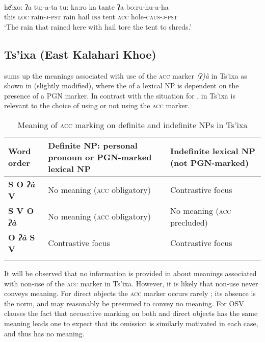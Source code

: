 \documentclass[output=paper]{LSP/langsci}
\begin{document}
\ea {}\\ \label{09-mc-ex:23}
\gll he͂:xo: ʔa tu:-a-ta tu: ka:ro ka tante ʔa bo:ru-hu-a-ha\\
this \textsc{loc} rain-\textsc{j}-\textsc{pst} rain hail \textsc{ins} tent \textsc{acc} hole-\textsc{caus}-\textsc{j}-\textsc{pst}\\
\glt ‘The rain that rained here with hail tore the tent to shreds.’
\z


\subsection{Ts’ixa (East Kalahari Khoe)} \label{09-mc-sec:3-2} 

\citet[231]{Fehn2014Grammar} sums up the meanings associated with use of the \textsc{acc} marker \textit{(ʔ)à} in Ts’ixa as shown in  (slightly modified), where the  of a lexical NP is dependent on the presence of a PGN marker. In contrast with the situation for , in Ts’ixa  is relevant to the choice of using or not using the \textsc{acc} marker.


\begin{table}
\caption{Meaning of \textsc{acc} marking on definite and indefinite NPs in Ts’ixa}\label{09-mc-tab:7}

\begin{tabularx}{\textwidth}{lQQ}
\lsptoprule
{{\bfseries Word order}} & {{\bfseries Definite NP: personal pronoun or PGN-marked lexical NP}} & {\bfseries Indefinite lexical NP (not PGN-marked)}\\
\midrule
{\bfseries S O \textit{ʔà} V} & No meaning (\textsc{acc} obligatory) & Contrastive focus\\
{\bfseries S V O \textit{ʔà}} & No meaning (\textsc{acc} obligatory) & No meaning (\textsc{acc} precluded)\\
{\bfseries O \textit{ʔà} S V} & Contrastive focus & Contrastive focus\\
\lspbottomrule
\end{tabularx}
\end{table}

It will be observed that no information is provided in  about meanings associated with non-use of the \textsc{acc} marker in Ts’ixa. However, it is likely that non-use never conveys meaning. For  direct objects the \textsc{acc} marker occurs rarely \citep[229]{Fehn2014Grammar}; its absence is the norm, and may reasonably be presumed to convey no meaning. For OSV clauses the fact that accusative marking on both  and  direct objects has the same meaning leads one to expect that its omission is similarly motivated in each case, and thus has no meaning.
\end{document}
